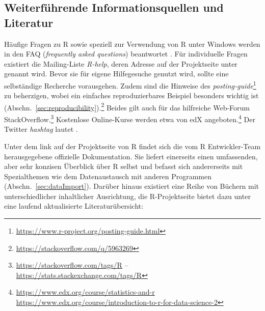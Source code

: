\subsection{Weiterführende Informationsquellen und Literatur}
\label{sec:documentation}

Häufige Fragen zu R sowie speziell zur Verwendung von R unter Windows werden in den FAQ (\emph{frequently asked questions}) beantwortet \cite{Hornik2009, Ripley2008}. Für individuelle Fragen existiert die Mailing-Liste \emph{R-help}, deren Adresse auf der Projektseite unter  genannt wird. Bevor sie für eigene Hilfegesuche genutzt wird, sollte eine selbständige Recherche vorausgehen. Zudem sind die Hinweise des \emph{posting-guide}\footnote{\url{https://www.r-project.org/posting-guide.html}} zu beherzigen, wobei ein einfaches reproduzierbares Beispiel besonders wichtig ist (Abschn.\ \ref{sec:reproducibility}).\footnote{\url{https://stackoverflow.com/q/5963269}} Beides gilt auch für das hilfreiche Web-Forum StackOverflow.\footnote{%
\url{https://stackoverflow.com/tags/R} -- \url{https://stats.stackexchange.com/tags/R}}
Kostenlose Online-Kurse werden etwa von edX angeboten.\footnote{%
\url{https://www.edx.org/course/statistics-and-r}\\
\url{https://www.edx.org/course/introduction-to-r-for-data-science-2}} Der Twitter \emph{hashtag} lautet .


Unter dem link  auf der Projektseite von R findet sich die vom R Entwickler-Team herausgegebene offizielle Dokumentation. Sie liefert einerseits einen umfassenden, aber sehr konzisen Überblick über R selbst \cite{Venables2008} und befasst sich andererseits mit Spezialthemen wie dem Datenaustausch mit anderen Programmen (Abschn.\ \ref{sec:dataImport}).%
Darüber hinaus existiert eine Reihe von Büchern mit unterschiedlicher inhaltlicher Ausrichtung, die R-Projektseite bietet dazu unter  eine laufend aktualisierte Literaturübersicht:

